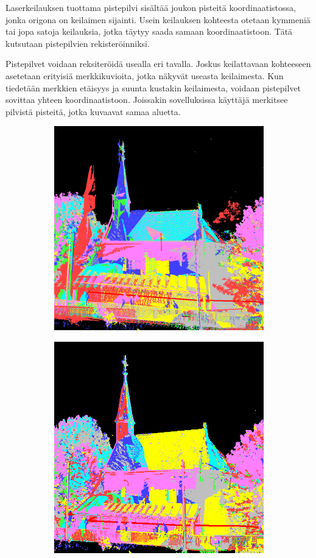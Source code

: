 Laserkeilauksen tuottama pistepilvi sisältää joukon pisteitä koordinaatistossa, jonka origona on keilaimen sijainti. Usein keilauksen kohteesta otetaan kymmeniä tai jopa satoja keilauksia, jotka täytyy saada samaan koordinaatistoon. Tätä kutsutaan pistepilvien rekisteröinniksi. 

Pistepilvet voidaan reksiteröidä usealla eri tavalla. Joskus keilattavaan kohteeseen asetetaan erityisiä merkkikuvioita, jotka näkyvät useasta keilaimesta. Kun tiedetään merkkien etäisyys ja suunta kustakin keilaimesta, voidaan pistepilvet sovittaa yhteen koordinaatistoon. Joissakin sovelluksissa käyttäjä merkitsee pilvistä pisteitä, jotka kuvaavat samaa aluetta.

\begin{figure}
    \begin{subfigure}{.5\textwidth}
        \centering
        \includegraphics[width=.89\linewidth]{img/reg1.png}
        \caption{}
    \end{subfigure}%
    \begin{subfigure}{.5\textwidth}
        \centering
        \includegraphics[width=.855\linewidth]{img/reg2.png}

\end{subfigure}
\end{figure}
